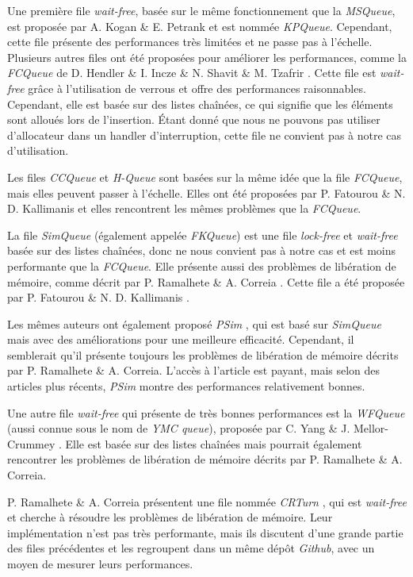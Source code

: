 Une première file \emph{wait-free}, basée sur le même fonctionnement que la \emph{MSQueue},
est proposée par A. Kogan \& E. Petrank \cite{10.1145/1941553.1941585} et est nommée \emph{KPQueue}.
Cependant, cette file présente des performances très limitées et ne passe pas à l'échelle.
Plusieurs autres files ont été proposées pour améliorer les performances,
comme la \emph{FCQueue} de D. Hendler \& I. Incze \& N. Shavit \& M. Tzafrir \cite{10.1145/1810479.1810540}.
Cette file est \emph{wait-free} grâce à l'utilisation de verrous et offre des performances raisonnables.
Cependant, elle est basée sur des listes chaînées, ce qui signifie que les éléments sont alloués lors de l'insertion.
Étant donné que nous ne pouvons pas utiliser d'allocateur dans un handler d'interruption,
cette file ne convient pas à notre cas d'utilisation.

Les files \emph{CCQueue} et \emph{H-Queue} sont basées sur la même idée que la file \emph{FCQueue}, mais elles peuvent passer à l'échelle.
Elles ont été proposées par P. Fatourou \& N. D. Kallimanis \cite{10.1145/2370036.2145849} et elles rencontrent les mêmes problèmes que la \emph{FCQueue}.

La file \emph{SimQueue} (également appelée \emph{FKQueue}) est une file \emph{lock-free} et \emph{wait-free} basée sur des listes chaînées,
donc ne nous convient pas à notre cas et est moins performante que la \emph{FCQueue}.
Elle présente aussi des problèmes de libération de mémoire, comme décrit par P. Ramalhete \& A. Correia \cite{10.1145/3155284.3019022}.
Cette file a été proposée par P. Fatourou \& N. D. Kallimanis \cite{10.1145/1989493.1989549}.

Les mêmes auteurs ont également proposé \emph{PSim} \cite{Fatourou2014}, qui est basé sur \emph{SimQueue} mais avec des améliorations pour une meilleure efficacité.
Cependant, il semblerait qu'il présente toujours les problèmes de libération de mémoire décrits par P. Ramalhete \& A. Correia.
L'accès à l'article est payant, mais selon des articles plus récents, \emph{PSim} montre des performances relativement bonnes.

Une autre file \emph{wait-free} qui présente de très bonnes performances est la \emph{WFQueue} (aussi connue sous le nom de \emph{YMC queue}),
proposée par C. Yang \& J. Mellor-Crummey \cite{10.1145/3016078.2851168}.
Elle est basée sur des listes chaînées mais pourrait également rencontrer les problèmes de libération de mémoire décrits par P. Ramalhete \& A. Correia.

P. Ramalhete \& A. Correia présentent une file nommée \emph{CRTurn} \cite{10.1145/3155284.3019022}, qui est \emph{wait-free} et cherche à résoudre les problèmes de libération de mémoire.
Leur implémentation n'est pas très performante, mais ils discutent d'une grande partie des files précédentes et les regroupent dans un même dépôt \emph{Github}, avec un moyen de mesurer leurs performances.

